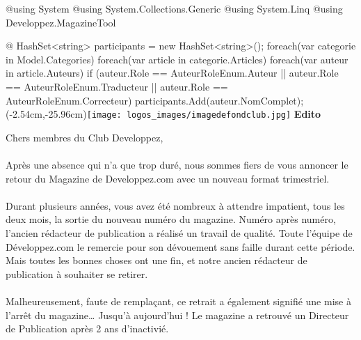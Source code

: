 ﻿@using System
@using System.Collections.Generic
@using System.Linq
@using Developpez.MagazineTool

@{
	HashSet<string> participants = new HashSet<string>();
	foreach(var categorie in Model.Categories)
	{
		foreach(var article in categorie.Articles)
		{
			foreach(var auteur in article.Auteurs)
			{
				if (auteur.Role == AuteurRoleEnum.Auteur ||
					auteur.Role == AuteurRoleEnum.Traducteur ||
					auteur.Role == AuteurRoleEnum.Correcteur)
				{
					participants.Add(auteur.NomComplet);
				}
			}
		}
	}
}
\fancyput(-2.54cm,-25.96cm){\texttt{[image: logos\_images/imagedefondclub.jpg]}}%
{\Huge\sffamily\textbf{\textcolor{bleudvp}{Edito}}}\par\vspace{\baselineskip}
Chers membres du Club Developpez,

\paragraph*{}

Après une absence qui n'a que trop duré, nous sommes fiers de vous annoncer le retour du Magazine de Developpez.com avec un nouveau format trimestriel.

\paragraph*{}

Durant plusieurs années, vous avez été nombreux à attendre impatient, tous les deux mois, la sortie du nouveau numéro du magazine. Numéro après numéro, l’ancien rédacteur de publication a
réalisé un travail de qualité. Toute l’équipe de Développez.com le remercie pour son dévouement sans faille durant cette période. Mais toutes les bonnes choses ont une fin, et notre ancien 
rédacteur de publication à souhaiter se retirer. 

\paragraph*{}

Malheureusement, faute de remplaçant, ce retrait a également signifié une mise à l’arrêt du magazine… Jusqu’à aujourd’hui ! Le magazine a retrouvé un Directeur de Publication après 2 ans d'inactivié. 

\paragraph*{}


